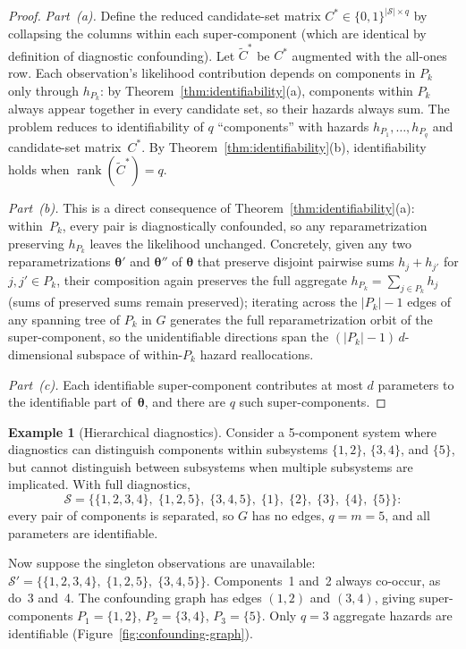 \documentclass[11pt]{article}
\theoremstyle{definition}
\newtheorem{example}{Example}
\theoremstyle{plain}
\renewcommand{\v}[1]{\boldsymbol{#1}}
\begin{document}
\begin{proof}
\emph{Part~(a).}
Define the reduced candidate-set matrix
$C^* \in \{0,1\}^{|\mathcal{S}| \times q}$ by collapsing the
columns within each super-component (which are identical by
definition of diagnostic confounding).
Let $\tilde{C}^*$ be $C^*$ augmented with the all-ones row.
Each observation's likelihood contribution depends on components in
$P_k$ only through $h_{P_k}$: by
Theorem~\ref{thm:identifiability}(a), components within $P_k$
always appear together in every candidate set, so their hazards
always sum.
The problem reduces to identifiability of $q$ ``components'' with
hazards $h_{P_1}, \ldots, h_{P_q}$ and candidate-set matrix~$C^*$.
By Theorem~\ref{thm:identifiability}(b), identifiability holds when
$\operatorname{rank}(\tilde{C}^*) = q$.

\emph{Part~(b).}
This is a direct consequence of
Theorem~\ref{thm:identifiability}(a): within~$P_k$, every pair is
diagnostically confounded, so any reparametrization preserving
$h_{P_k}$ leaves the likelihood unchanged.
Concretely, given any two reparametrizations $\v{\theta}'$ and
$\v{\theta}''$ of $\v{\theta}$ that preserve disjoint pairwise sums
$h_j + h_{j'}$ for $j, j' \in P_k$, their composition again preserves
the full aggregate $h_{P_k} = \sum_{j \in P_k} h_j$ (sums of preserved
sums remain preserved); iterating across the $|P_k|-1$ edges of any
spanning tree of $P_k$ in $G$ generates the full reparametrization
orbit of the super-component, so the unidentifiable directions span
the $(|P_k|-1)\,d$-dimensional subspace of within-$P_k$ hazard
reallocations.

\emph{Part~(c).}
Each identifiable super-component contributes at most $d$ parameters
to the identifiable part of~$\v{\theta}$, and there are $q$ such
super-components.
\end{proof}

\begin{example}[Hierarchical diagnostics]
\label{ex:hierarchical}
Consider a 5-component system where diagnostics can distinguish
components within subsystems $\{1, 2\}$, $\{3, 4\}$, and $\{5\}$,
but cannot distinguish between subsystems when multiple subsystems
are implicated.
With full diagnostics,
\[
\mathcal{S} = \bigl\{\{1,2,3,4\},\; \{1,2,5\},\;
\{3,4,5\},\; \{1\},\; \{2\},\; \{3\},\; \{4\},\; \{5\}\bigr\}:
\]
every pair of components is separated, so $G$ has no edges,
$q = m = 5$, and all parameters are identifiable.

Now suppose the singleton observations are unavailable:
$\mathcal{S}' = \bigl\{\{1,2,3,4\},\; \{1,2,5\},\; \{3,4,5\}\bigr\}$.
Components~1 and~2 always co-occur, as do~3 and~4.
The confounding graph has edges $(1,2)$ and $(3,4)$, giving
super-components $P_1 = \{1,2\}$, $P_2 = \{3,4\}$,
$P_3 = \{5\}$.
Only $q = 3$ aggregate hazards are identifiable
(Figure~\ref{fig:confounding-graph}).
\end{example}
\end{document}
